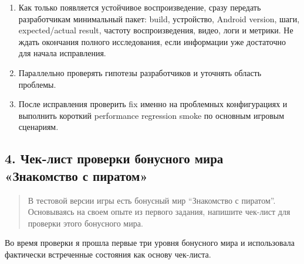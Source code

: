\documentclass{ZGJournalArticle_2026}
\begin{document}
\begin{enumerate}
\item
  Как только появляется устойчивое воспроизведение, сразу передать
  разработчикам минимальный пакет: build, устройство, Android version,
  шаги, expected/actual result, частоту воспроизведения, видео, логи и
  метрики. Не ждать окончания полного исследования, если информации уже
  достаточно для начала исправления.
\item
  Параллельно проверять гипотезы разработчиков и уточнять область
  проблемы.
\item
  После исправления проверить fix именно на проблемных конфигурациях и
  выполнить короткий performance regression smoke по основным игровым
  сценариям.
\end{enumerate}

\newpage

\subsection{4. Чек-лист проверки бонусного мира «Знакомство с
пиратом»}\label{ux447ux435ux43a-ux43bux438ux441ux442-ux43fux440ux43eux432ux435ux440ux43aux438-ux431ux43eux43dux443ux441ux43dux43eux433ux43e-ux43cux438ux440ux430-ux437ux43dux430ux43aux43eux43cux441ux442ux432ux43e-ux441-ux43fux438ux440ux430ux442ux43eux43c}

\begin{quote}
В тестовой версии игры есть бонусный мир ``Знакомство с пиратом''.
Основываясь на своем опыте из первого задания, напишите чек-лист для
проверки этого бонусного мира.
\end{quote}

Во время проверки я прошла первые три уровня бонусного мира и
использовала фактически встреченные состояния как основу чек-листа.
\end{document}
